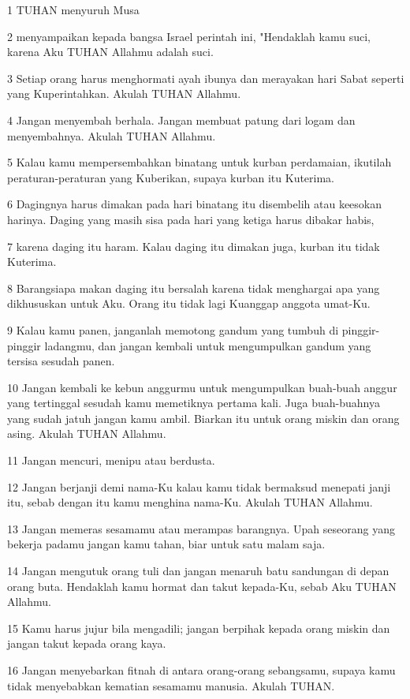 \par 1 TUHAN menyuruh Musa
\par 2 menyampaikan kepada bangsa Israel perintah ini, "Hendaklah kamu suci, karena Aku TUHAN Allahmu adalah suci.
\par 3 Setiap orang harus menghormati ayah ibunya dan merayakan hari Sabat seperti yang Kuperintahkan. Akulah TUHAN Allahmu.
\par 4 Jangan menyembah berhala. Jangan membuat patung dari logam dan menyembahnya. Akulah TUHAN Allahmu.
\par 5 Kalau kamu mempersembahkan binatang untuk kurban perdamaian, ikutilah peraturan-peraturan yang Kuberikan, supaya kurban itu Kuterima.
\par 6 Dagingnya harus dimakan pada hari binatang itu disembelih atau keesokan harinya. Daging yang masih sisa pada hari yang ketiga harus dibakar habis,
\par 7 karena daging itu haram. Kalau daging itu dimakan juga, kurban itu tidak Kuterima.
\par 8 Barangsiapa makan daging itu bersalah karena tidak menghargai apa yang dikhususkan untuk Aku. Orang itu tidak lagi Kuanggap anggota umat-Ku.
\par 9 Kalau kamu panen, janganlah memotong gandum yang tumbuh di pinggir-pinggir ladangmu, dan jangan kembali untuk mengumpulkan gandum yang tersisa sesudah panen.
\par 10 Jangan kembali ke kebun anggurmu untuk mengumpulkan buah-buah anggur yang tertinggal sesudah kamu memetiknya pertama kali. Juga buah-buahnya yang sudah jatuh jangan kamu ambil. Biarkan itu untuk orang miskin dan orang asing. Akulah TUHAN Allahmu.
\par 11 Jangan mencuri, menipu atau berdusta.
\par 12 Jangan berjanji demi nama-Ku kalau kamu tidak bermaksud menepati janji itu, sebab dengan itu kamu menghina nama-Ku. Akulah TUHAN Allahmu.
\par 13 Jangan memeras sesamamu atau merampas barangnya. Upah seseorang yang bekerja padamu jangan kamu tahan, biar untuk satu malam saja.
\par 14 Jangan mengutuk orang tuli dan jangan menaruh batu sandungan di depan orang buta. Hendaklah kamu hormat dan takut kepada-Ku, sebab Aku TUHAN Allahmu.
\par 15 Kamu harus jujur bila mengadili; jangan berpihak kepada orang miskin dan jangan takut kepada orang kaya.
\par 16 Jangan menyebarkan fitnah di antara orang-orang sebangsamu, supaya kamu tidak menyebabkan kematian sesamamu manusia. Akulah TUHAN.
